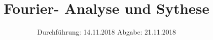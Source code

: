 

\subject{Versuch 351}
\title{Fourier- Analyse und Sythese}
\date{%
  Durchführung: 14.11.2018
  \hspace{3em}
  Abgabe: 21.11.2018
}



\maketitle
\thispagestyle{empty}
\tableofcontents
\newpage



%


\printbibliography{}


